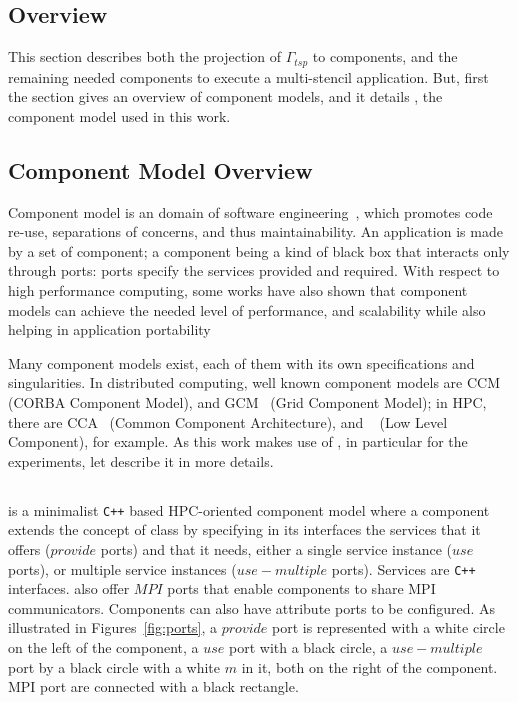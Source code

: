 \subsection{Overview}

This section describes both the projection of $\Gamma_{tsp}$ to
components, and the remaining needed components to execute a
multi-stencil application. But, first the section gives an overview of
component models, and it details \llc, the component model used in
this work.


\subsection{Component Model Overview}
Component model is an domain of software
engineering~\cite{Szyperski:2002:CSB:515228}, which promotes code
re-use, separations of concerns, and thus maintainability. An
application is made by a set of component; a component being a kind of
black box that interacts only through ports: ports specify the
services provided and required.
%
With respect to high performance computing, some works have also shown
that component models can achieve the needed level of performance, and
scalability while also helping in application
portability~\cite{Bernholdt01052006, bigot:inria-00388508, UCHPC2015}

Many component models exist, each of them with its own specifications
and singularities. In distributed computing, well known component
models are CCM~\cite{corba:omg06} (CORBA Component Model), and
GCM~\cite{Baude} (Grid Component Model); in HPC, there are
CCA~\cite{Bernholdt01052006} (Common Component Architecture), and
\llc~\cite{l2c} (Low Level Component), for example.
%
As this work makes use of \llc, in particular for the experiments, let
describe it in more details.

\subsection{\llc}

\llc is a minimalist \texttt{C++} based HPC-oriented component model
where a component extends the concept of class by specifying in its
interfaces the services that it offers ($provide$ ports) and that it
needs, either a single service instance ($use$ ports), or multiple
service instances ($use-multiple$ ports). Services are \texttt{C++}
interfaces. \llc also offer $MPI$ ports that enable components to
share MPI communicators. Components can also have attribute ports to
be configured.
%
As illustrated in Figures~\ref{fig:ports}, a $provide$ port is
represented with a white circle on the left of the component, a $use$
port with a black circle, a $use-multiple$ port by a black circle with
a white $m$ in it, both on the right of the component. MPI port are
connected with a black rectangle.

